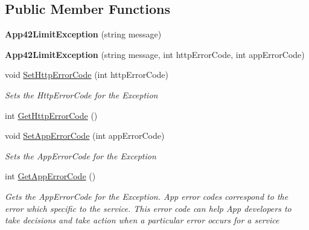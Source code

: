 \subsection*{Public Member Functions}
\begin{DoxyCompactItemize}
\item 
\hypertarget{classcom_1_1shephertz_1_1app42_1_1paas_1_1sdk_1_1windows_1_1_app42_limit_exception_aba20ebc351ede8aa289de0a0d851082e}{{\bfseries App42\+Limit\+Exception} (string message)}\label{classcom_1_1shephertz_1_1app42_1_1paas_1_1sdk_1_1windows_1_1_app42_limit_exception_aba20ebc351ede8aa289de0a0d851082e}

\item 
\hypertarget{classcom_1_1shephertz_1_1app42_1_1paas_1_1sdk_1_1windows_1_1_app42_limit_exception_a45fe6bb7c541005ef6f2f49d5cb82df3}{{\bfseries App42\+Limit\+Exception} (string message, int http\+Error\+Code, int app\+Error\+Code)}\label{classcom_1_1shephertz_1_1app42_1_1paas_1_1sdk_1_1windows_1_1_app42_limit_exception_a45fe6bb7c541005ef6f2f49d5cb82df3}

\item 
void \hyperlink{classcom_1_1shephertz_1_1app42_1_1paas_1_1sdk_1_1windows_1_1_app42_limit_exception_a77ecab1e0c9b1bcbd1780ebee3a55fb9}{Set\+Http\+Error\+Code} (int http\+Error\+Code)
\begin{DoxyCompactList}\small\item\em Sets the Http\+Error\+Code for the Exception \end{DoxyCompactList}\item 
int \hyperlink{classcom_1_1shephertz_1_1app42_1_1paas_1_1sdk_1_1windows_1_1_app42_limit_exception_a5d25eba9d407021353d5d62c82d7795b}{Get\+Http\+Error\+Code} ()
\item 
void \hyperlink{classcom_1_1shephertz_1_1app42_1_1paas_1_1sdk_1_1windows_1_1_app42_limit_exception_aa21bd2874f0f05347439128b188e0c97}{Set\+App\+Error\+Code} (int app\+Error\+Code)
\begin{DoxyCompactList}\small\item\em Sets the App\+Error\+Code for the Exception \end{DoxyCompactList}\item 
int \hyperlink{classcom_1_1shephertz_1_1app42_1_1paas_1_1sdk_1_1windows_1_1_app42_limit_exception_a3394b7f6f7fa2ecf0b0183d0997a6276}{Get\+App\+Error\+Code} ()
\begin{DoxyCompactList}\small\item\em Gets the App\+Error\+Code for the Exception. App error codes correspond to the error which specific to the service. This error code can help App developers to take decisions and take action when a particular error occurs for a service \end{DoxyCompactList}\end{DoxyCompactItemize}


